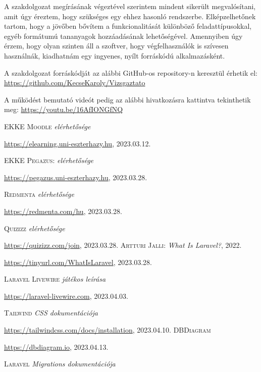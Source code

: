 \documentclass[
]{thesis-ekf}
\theoremstyle{definition}
\theoremstyle{remark}
\begin{document}
        A szakdolgozat megírásának végeztével szerintem mindent sikerült megvalósítani, amit úgy éreztem, hogy szükséges egy ehhez hasonló rendszerbe.
        Elképzelhetőnek tartom, hogy a jövőben bővítem a funkcionalitását különböző feladattípusokkal, egyéb formátumú tananyagok hozzáadásának lehetőségével. Amennyiben úgy érzem, hogy olyan szinten áll a szoftver, hogy végfelhasználók is szívesen használnák, kiadhatnám egy ingyenes, nyílt forráskódú alkalmazásként.

        A szakdolgozat forráskódját az alábbi GitHub-os repository-n keresztül érhetik el: \url{https://github.com/KecseKaroly/Vizsgaztato}

        A működést bemutató videót pedig az alábbi hivatkozásra kattintva tekinthetik meg: \url{https://youtu.be/16AfIONGfNQ}
            \begin{thebibliography}{2}
		\textsc{EKKE Moodle} \emph{elérhetősége}
		
		\url{https://elearning.uni-eszterhazy.hu}, 2023.03.12.

		\textsc{EKKE Pegazus}: \emph{elérhetősége}
		
		\url{https://pegazus.uni-eszterhazy.hu}, 2023.03.28.

		\textsc{Redmenta} \emph{elérhetősége}
		
		\url{https://redmenta.com/hu}, 2023.03.28.
  
		\textsc{Quizizz} \emph{elérhetősége}
		
		\url{https://quizizz.com/join}, 2023.03.28.
		\textsc{Artturi Jalli}: \emph{What Is Laravel?}, 2022.
		
		\url{https://tinyurl.com/WhatIsLaravel}, 2023.03.28.
		

		\textsc{Laravel Livewire} \emph{játékos leírása}
		
		\url{https://laravel-livewire.com}, 2023.04.03.

		\textsc{Tailwind} \emph{CSS dokumentációja}
		
		\url{https://tailwindcss.com/docs/installation}, 2023.04.10.
		\textsc{DBDiagram}
		
		\url{https://dbdiagram.io}, 2023.04.13.

		\textsc{Laravel} \emph{Migrations dokumentációja}
		

\end{thebibliography}
\end{document}
